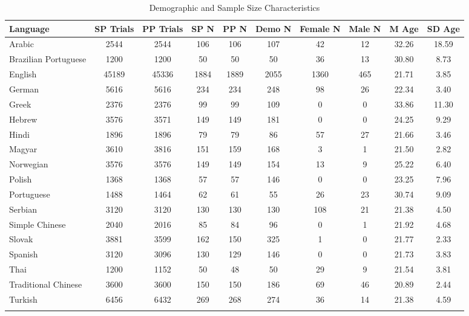 \documentclass[
  man,floatsintext]{apa7}
\begin{document}
\begin{table}[tbp]

\begin{center}
\begin{threeparttable}

\caption{\label{tab:sample-table}Demographic and Sample Size Characteristics}

\footnotesize{

\begin{tabular}{lccccccccc}
\toprule
Language & SP 
Trials & PP 
Trials & SP 
N & PP 
N & Demo 
N & Female 
N & Male 
N & M 
Age & SD 
Age\\
\midrule
Arabic & 2544 & 2544 & 106 & 106 & 107 & 42 & 12 & 32.26 & 18.59\\
Brazilian Portuguese & 1200 & 1200 & 50 & 50 & 50 & 36 & 13 & 30.80 & 8.73\\
English & 45189 & 45336 & 1884 & 1889 & 2055 & 1360 & 465 & 21.71 & 3.85\\
German & 5616 & 5616 & 234 & 234 & 248 & 98 & 26 & 22.34 & 3.40\\
Greek & 2376 & 2376 & 99 & 99 & 109 & 0 & 0 & 33.86 & 11.30\\
Hebrew & 3576 & 3571 & 149 & 149 & 181 & 0 & 0 & 24.25 & 9.29\\
Hindi & 1896 & 1896 & 79 & 79 & 86 & 57 & 27 & 21.66 & 3.46\\
Magyar & 3610 & 3816 & 151 & 159 & 168 & 3 & 1 & 21.50 & 2.82\\
Norwegian & 3576 & 3576 & 149 & 149 & 154 & 13 & 9 & 25.22 & 6.40\\
Polish & 1368 & 1368 & 57 & 57 & 146 & 0 & 0 & 23.25 & 7.96\\
Portuguese & 1488 & 1464 & 62 & 61 & 55 & 26 & 23 & 30.74 & 9.09\\
Serbian & 3120 & 3120 & 130 & 130 & 130 & 108 & 21 & 21.38 & 4.50\\
Simple Chinese & 2040 & 2016 & 85 & 84 & 96 & 0 & 1 & 21.92 & 4.68\\
Slovak & 3881 & 3599 & 162 & 150 & 325 & 1 & 0 & 21.77 & 2.33\\
Spanish & 3120 & 3096 & 130 & 129 & 146 & 0 & 0 & 21.73 & 3.83\\
Thai & 1200 & 1152 & 50 & 48 & 50 & 29 & 9 & 21.54 & 3.81\\
Traditional Chinese & 3600 & 3600 & 150 & 150 & 186 & 69 & 46 & 20.89 & 2.44\\
Turkish & 6456 & 6432 & 269 & 268 & 274 & 36 & 14 & 21.38 & 4.59\\
\bottomrule
\addlinespace
\end{tabular}

}
\end{threeparttable}
\end{center}
\end{table}
\end{document}
